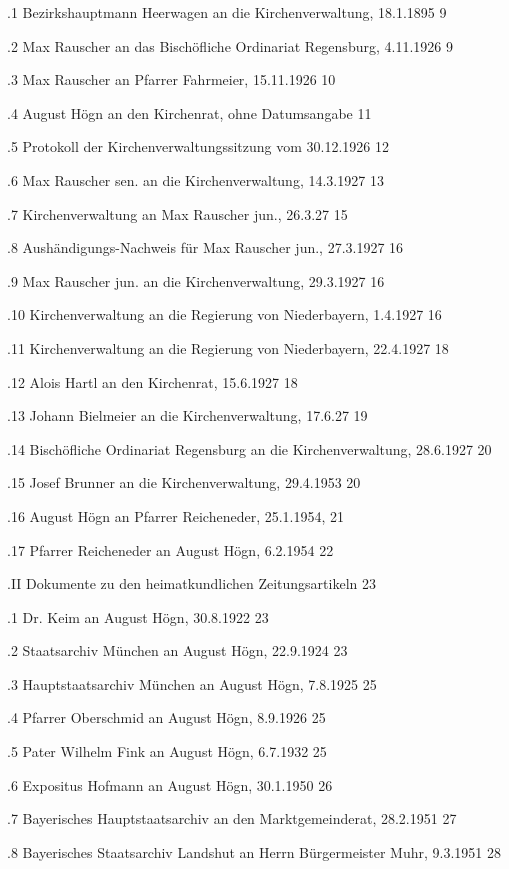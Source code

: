 \documentclass[12pt,a4pager]{book}
\begin{document}
.1 Bezirkshauptmann Heerwagen an die Kirchenverwaltung, 18.1.1895   9

.2 Max Rauscher an das Bischöfliche Ordinariat Regensburg, 4.11.1926    9

.3 Max Rauscher an Pfarrer Fahrmeier, 15.11.1926    10

.4 August Högn an den Kirchenrat, ohne Datumsangabe 11

.5 Protokoll der Kirchenverwaltungssitzung vom 30.12.1926   12

.6 Max Rauscher sen. an die Kirchenverwaltung, 14.3.1927    13

.7 Kirchenverwaltung an Max Rauscher jun., 26.3.27  15

.8 Aushändigungs-Nachweis für Max Rauscher jun., 27.3.1927  16

.9 Max Rauscher jun. an die Kirchenverwaltung, 29.3.1927    16

.10 Kirchenverwaltung an die Regierung von Niederbayern, 1.4.1927   16

.11 Kirchenverwaltung an die Regierung von Niederbayern, 22.4.1927  18

.12 Alois Hartl an den Kirchenrat, 15.6.1927    18

.13 Johann Bielmeier an die Kirchenverwaltung, 17.6.27  19

.14 Bischöfliche Ordinariat Regensburg an die Kirchenverwaltung, 28.6.1927  20

.15 Josef Brunner an die Kirchenverwaltung, 29.4.1953   20

.16 August Högn an Pfarrer Reicheneder, 25.1.1954,  21

.17 Pfarrer Reicheneder an August Högn, 6.2.1954    22

.II Dokumente zu den heimatkundlichen Zeitungsartikeln  23

.1 Dr. Keim an August Högn, 30.8.1922   23

.2 Staatsarchiv München an August Högn, 22.9.1924   23

.3 Hauptstaatsarchiv München an August Högn, 7.8.1925   25

.4 Pfarrer Oberschmid an August Högn, 8.9.1926  25

.5 Pater Wilhelm Fink an August Högn, 6.7.1932  25

.6 Expositus Hofmann an August Högn, 30.1.1950  26

.7 Bayerisches Hauptstaatsarchiv an den Marktgemeinderat, 28.2.1951     27

.8 Bayerisches Staatsarchiv Landshut an Herrn Bürgermeister Muhr, 9.3.1951  28
\end{document}
